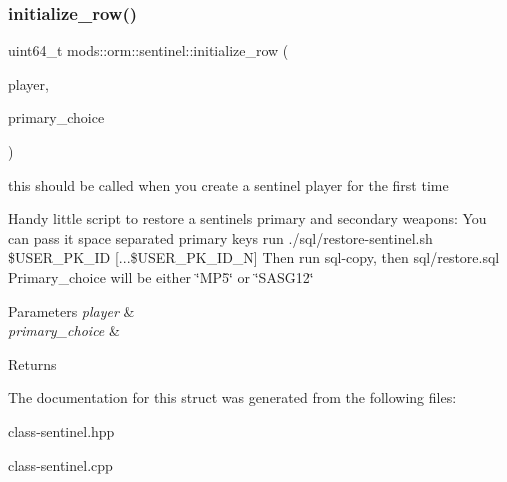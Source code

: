\subsubsection{\texorpdfstring{initialize\+\_\+row()}{initialize\_row()}}
{\footnotesize\ttfamily uint64\+\_\+t mods\+::orm\+::sentinel\+::initialize\+\_\+row (\begin{DoxyParamCaption}\item[{player\+\_\+ptr\+\_\+t \&}]{player,  }\item[{primary\+\_\+choice\+\_\+t}]{primary\+\_\+choice }\end{DoxyParamCaption})}



this should be called when you create a sentinel player for the first time 

Handy little script to restore a sentinel\textquotesingle{}s primary and secondary weapons\+: You can pass it space separated primary keys run ./sql/restore-\/sentinel.sh \$\+U\+S\+E\+R\+\_\+\+P\+K\+\_\+\+ID \mbox{[}...\$\+U\+S\+E\+R\+\_\+\+P\+K\+\_\+\+I\+D\+\_\+N\mbox{]} Then run sql-\/copy, then  sql/restore.\+sql Primary\+\_\+choice will be either \char`\"{}\+M\+P5\char`\"{} or \char`\"{}\+S\+A\+S\+G12\char`\"{} 
\begin{DoxyParams}{Parameters}
{\em player} & \\
\hline
{\em primary\+\_\+choice} & \\
\hline
\end{DoxyParams}
\begin{DoxyReturn}{Returns}

\end{DoxyReturn}


The documentation for this struct was generated from the following files\+:\begin{DoxyCompactItemize}
\item 
class-\/sentinel.\+hpp\item 
class-\/sentinel.\+cpp\end{DoxyCompactItemize}
